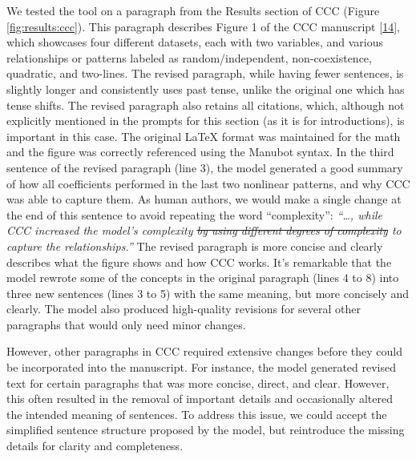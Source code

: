 \documentclass[
]{article}
\begin{document}
We tested the tool on a paragraph from the Results section of CCC (Figure \ref{fig:results:ccc}).
This paragraph describes Figure 1 of the CCC manuscript {[}\protect\hyperlink{ref-eirYTTyk}{14}{]}, which showcases four different datasets, each with two variables, and various relationships or patterns labeled as random/independent, non-coexistence, quadratic, and two-lines.
The revised paragraph, while having fewer sentences, is slightly longer and consistently uses past tense, unlike the original one which has tense shifts.
The revised paragraph also retains all citations, which, although not explicitly mentioned in the prompts for this section (as it is for introductions), is important in this case.
The original LaTeX format was maintained for the math and the figure was correctly referenced using the Manubot syntax.
In the third sentence of the revised paragraph (line 3), the model generated a good summary of how all coefficients performed in the last two nonlinear patterns, and why CCC was able to capture them.
As human authors, we would make a single change at the end of this sentence to avoid repeating the word ``complexity'': \emph{``\ldots, while CCC increased the model's complexity \sout{by using different degrees of complexity} to capture the relationships.''}
The revised paragraph is more concise and clearly describes what the figure shows and how CCC works.
It's remarkable that the model rewrote some of the concepts in the original paragraph (lines 4 to 8) into three new sentences (lines 3 to 5) with the same meaning, but more concisely and clearly.
The model also produced high-quality revisions for several other paragraphs that would only need minor changes.

However, other paragraphs in CCC required extensive changes before they could be incorporated into the manuscript.
For instance, the model generated revised text for certain paragraphs that was more concise, direct, and clear.
However, this often resulted in the removal of important details and occasionally altered the intended meaning of sentences.
To address this issue, we could accept the simplified sentence structure proposed by the model, but reintroduce the missing details for clarity and completeness.

% 
\end{document}
